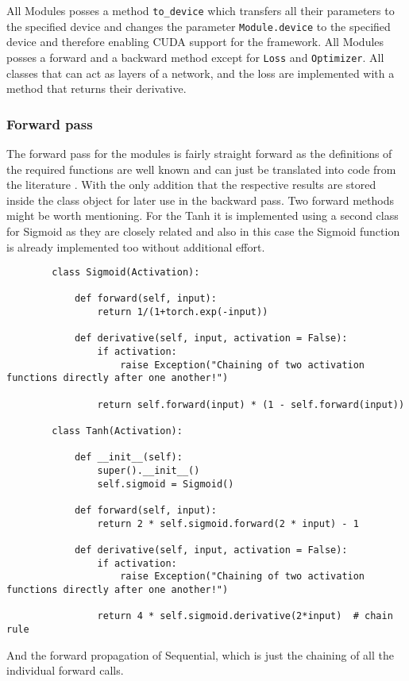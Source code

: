 \documentclass[11pt,english]{article}
\begin{document}
	All Modules posses a method \lstinline|to_device| which transfers all their parameters to the specified device and changes the parameter \lstinline|Module.device| to the specified device and therefore enabling CUDA support for the framework. All Modules posses a forward and a backward method except for \lstinline|Loss| and \lstinline|Optimizer|. All classes that can act as layers of a network, and the loss are implemented with a method that returns their derivative.
	
	\subsubsection*{Forward pass}
	
	The forward pass for the modules is fairly straight forward as the definitions of the required functions are well known and can just be translated into code from the literature \cite{Fleuret2022,Goodfellow-et-al-2016}. With the only addition that the respective results are stored inside the class object for later use in the backward pass. Two forward methods might be worth mentioning. For the Tanh it is implemented using a second class for Sigmoid as they are closely related and also in this case the Sigmoid function is already implemented too without additional effort.
	
	\begin{lstlisting}
		class Sigmoid(Activation):
			
			def forward(self, input):
				return 1/(1+torch.exp(-input))
			
			def derivative(self, input, activation = False):
				if activation:
					raise Exception("Chaining of two activation functions directly after one another!")
			
				return self.forward(input) * (1 - self.forward(input))
			
		class Tanh(Activation):
			
			def __init__(self):
				super().__init__()
				self.sigmoid = Sigmoid()
				
			def forward(self, input):
				return 2 * self.sigmoid.forward(2 * input) - 1
				
			def derivative(self, input, activation = False):
				if activation:
					raise Exception("Chaining of two activation functions directly after one another!")
				
				return 4 * self.sigmoid.derivative(2*input)  # chain rule  
	\end{lstlisting}
	
	And the forward propagation of Sequential, which is just the chaining of 
	all the individual forward calls.
	
\end{document}
